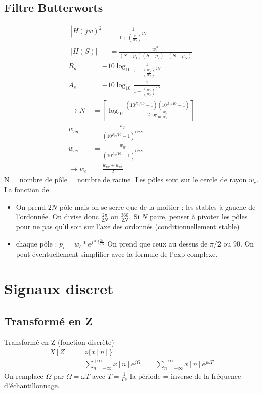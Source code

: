\documentclass{article}
\theoremstyle{plain}%
\theoremstyle{definition}
\theoremstyle{remark}
\begin{document}
\subsection{Filtre Butterworts}
\begin{align*}
    \left| H(jw)^2 \right| &= \frac{1}{1+ (\frac{w}{w_c})^{2N}} \\
    \left| H(S) \right| &= \frac{w_c^N}{(S-p_1)(S-p_2)\dots(S-p_N)}
\end{align*}
\begin{align*}
    R_p &= -10 \log_{10} \frac{1}{1 + (\frac{w_p}{w_c})^{2N}} \\
    A_s &= -10 \log_{10} \frac{1}{1 + (\frac{w_s}{w_c})^{2N}} \\
    \rightarrow N &= \left\lceil \log_{10} \frac{(10^{R_p/10} - 1)(10^{A_s/10} - 1)}{2 \log_{10} \frac{w_p}{w_s}}\right\rceil \\
    w_{cp} &= \frac{w_p}{(10^{R_p/10} - 1)^{1/2N}} \\
    w_{cs} &= \frac{w_w}{(10^{A_p/10} - 1)^{1/2N}} \\
    \rightarrow w_c &= \frac{w_{cp} + w_{cs}}{2}
\end{align*}
N = nombre de pôle = nombre de racine. Les pôles sont sur le cercle de rayon $ w_c $. La fonction de 
\begin{itemize}
    \item On prend $ 2N $ pôle mais on se serre que de la moitier : les stables à gauche de l'ordonnée. On divise donc $ \frac{2 \pi }{2N} $ ou $ \frac{360}{2N} $. Si $ N $ paire, penser à pivoter les pôles pour ne pas qu'il soit sur l'axe des ordonnés (conditionnellement stable)
    \item chaque pôle : $ p_i = w_c * e^{j * i \frac{2 \pi}{2N}} $ On prend que ceux au dessus de $ \pi /2 $ ou $ 90 $. On peut éventuellement simplifier avec la formule de l'exp complexe.
\end{itemize}






\section{Signaux discret}
\subsection{Transformé en Z}
Transformé en Z (fonction discrète) \begin{align*}
    X[Z] &= z\{x[n]\} \\ 
        &= \sum_{n=-\infty }^{+\infty }x[n]e^{j \Omega }
        &= \sum_{n=-\infty }^{+\infty }x[n]e^{j \omega T }
\end{align*}
On remplace $ \Omega  $ par $ \Omega = \omega T $ avec $ T = \frac{1}{Fs}$ la période = inverse de la fréquence d'échantillonnage.
\end{document}
